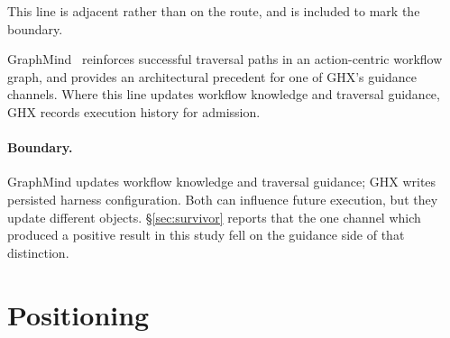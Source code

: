 This line is adjacent rather than on the route, and is included to mark the
boundary.


GraphMind~\cite{graphmind} reinforces successful traversal paths in an
action-centric workflow graph, and provides an architectural precedent for
one of GHX's guidance channels. Where this line updates workflow knowledge
and traversal guidance, GHX records execution history for admission.

\paragraph{Boundary.} GraphMind updates workflow knowledge and traversal
guidance; GHX writes persisted harness configuration. Both can influence
future execution, but they update different objects. \S\ref{sec:survivor}
reports that the one channel which produced a positive result in this study
fell on the guidance side of that distinction.

\section{Positioning}
\label{sec:positioning}


